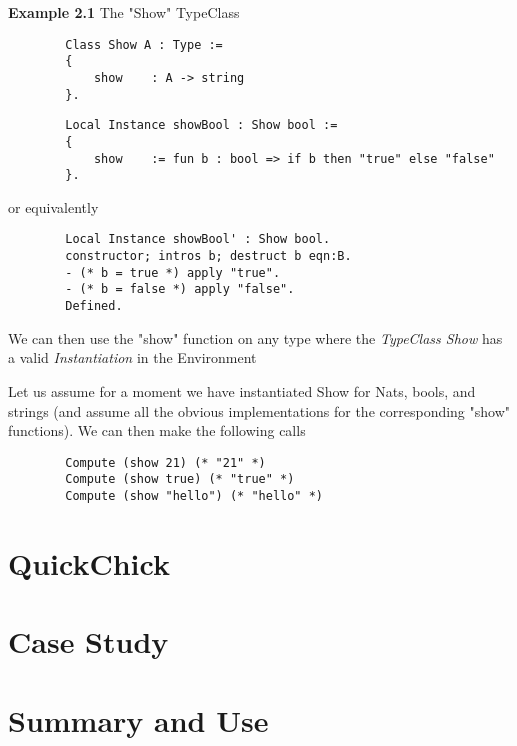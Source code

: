 \documentclass{article}
\begin{document}
    \textbf{Example 2.1} The "Show" TypeClass \\
    \begin{verbatim}
        Class Show A : Type :=
        {
            show    : A -> string
        }.
    \end{verbatim}
    \begin{verbatim}
        Local Instance showBool : Show bool :=
        {
            show    := fun b : bool => if b then "true" else "false"
        }.
    \end{verbatim}
    or equivalently
    \begin{verbatim}        
        Local Instance showBool' : Show bool.
        constructor; intros b; destruct b eqn:B.
        - (* b = true *) apply "true".
        - (* b = false *) apply "false".
        Defined.
    \end{verbatim}
    We can then use the "show" function on any type where the \emph{TypeClass Show} has a valid \emph{Instantiation} in the Environment

    Let us assume for a moment we have instantiated Show for Nats, bools, and strings (and assume all the obvious implementations for the corresponding "show" functions). 
    We can then make the following calls
    \begin{verbatim}
        Compute (show 21) (* "21" *)
        Compute (show true) (* "true" *)
        Compute (show "hello") (* "hello" *)
    \end{verbatim}



    \section{QuickChick}

    \section{Case Study}

    \section{Summary and Use}
\end{document}
